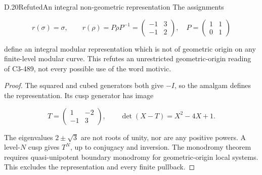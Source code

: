 \begin{statement}{D.20}{Refuted}{An integral non-geometric representation}
The assignments

$$
r(\sigma)=\sigma,\qquad
 r(\rho)=P\rho P^{-1}=\begin{pmatrix}-1&3\\-1&2\end{pmatrix},
 \quad P=\begin{pmatrix}1&1\\0&1\end{pmatrix}
$$

define an integral modular representation which is not
of geometric origin on any finite-level modular curve.
This refutes an unrestricted geometric-origin reading
of C3-489, not every possible use of the word motivic.
\end{statement}
\begin{proof}
The squared and cubed generators both give $-I$, so the
amalgam defines the representation.
Its cusp generator has image

$$
T=\begin{pmatrix}1&-2\\-1&3\end{pmatrix},
 \qquad\det(X-T)=X^2-4X+1.
$$

The eigenvalues $2\pm\sqrt3$ are not roots of unity,
nor are any positive powers.
A level-$N$ cusp gives $T^N$, up to conjugacy and inversion.
The monodromy theorem
\cite[Theorem 1.2]{D_EsnaultKerz} requires
quasi-unipotent boundary monodromy for geometric-origin
local systems. This excludes the representation and
every finite pullback.
\end{proof}

